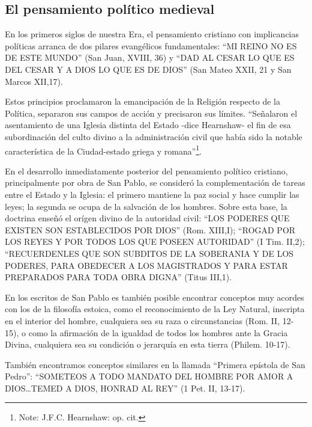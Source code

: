 \documentclass[
]{book}
\begin{document}
\hypertarget{el-pensamiento-poluxedtico-medieval}{%
\subsection*{El pensamiento político medieval}\label{el-pensamiento-poluxedtico-medieval}}

En los primeros siglos de nuestra Era, el pensamiento cristiano con implicancias políticas arranca de dos pilares evangélicos fundamentales: ``MI REINO NO ES DE ESTE MUNDO'' (San Juan, XVIII, 36) y ``DAD AL CESAR LO QUE ES DEL CESAR Y A DIOS LO QUE ES DE DIOS'' (San Mateo XXII, 21 y San Marcos XII,17).

Estos principios proclamaron la emancipación de la Religión respecto de la Política, separaron sus campos de acción y precisaron sus límites. ``Señalaron el asentamiento de una Iglesia distinta del Estado -dice Hearnshaw- el fin de esa subordinación del culto divino a la administración civil que había sido la notable característica de la Ciudad-estado griega y romana''\footnote{Note: J.F.C. Hearnshaw: op. cit.}.

En el desarrollo inmediatamente posterior del pensamiento político cristiano, principalmente por obra de San Pablo, se consideró la complementación de tareas entre el Estado y la Iglesia: el primero mantiene la paz social y hace cumplir las leyes; la segunda se ocupa de la salvación de los hombres. Sobre esta base, la doctrina enseñó el orígen divino de la autoridad civil: ``LOS PODERES QUE EXISTEN SON ESTABLECIDOS POR DIOS'' (Rom. XIII,I); ``ROGAD POR LOS REYES Y POR TODOS LOS QUE POSEEN AUTORIDAD'' (I Tim. II,2); ``RECUERDENLES QUE SON SUBDITOS DE LA SOBERANIA Y DE LOS PODERES, PARA OBEDECER A LOS MAGISTRADOS Y PARA ESTAR PREPARADOS PARA TODA OBRA DIGNA'' (Titus III,1).

En los escritos de San Pablo es también posible encontrar conceptos muy acordes con los de la filosofía estoica, como el reconocimiento de la Ley Natural, inscripta en el interior del hombre, cualquiera sea su raza o circunstancias (Rom. II, 12-15), o como la afirmación de la igualdad de todos los hombres ante la Gracia Divina, cualquiera sea su condición o jerarquía en esta tierra (Philem. 10-17).

También encontramos conceptos similares en la llamada ``Primera epístola de San Pedro'': ``SOMETEOS A TODO MANDATO DEL HOMBRE POR AMOR A DIOS\ldots TEMED A DIOS, HONRAD AL REY'' (1 Pet. II, 13-17).
\end{document}
